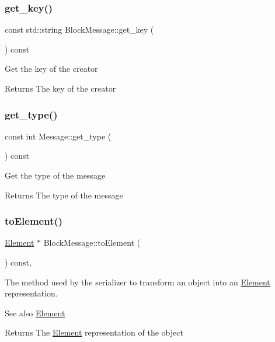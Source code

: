 \subsubsection{\texorpdfstring{get\+\_\+key()}{get\_key()}}
{\footnotesize\ttfamily const std\+::string Block\+Message\+::get\+\_\+key (\begin{DoxyParamCaption}{ }\end{DoxyParamCaption}) const}

Get the key of the creator

\begin{DoxyReturn}{Returns}
The key of the creator 
\end{DoxyReturn}
\mbox{\label{classMessage_a2a576dcffd45c4574fcdf2897ec26086}} 
\subsubsection{\texorpdfstring{get\+\_\+type()}{get\_type()}}
{\footnotesize\ttfamily const int Message\+::get\+\_\+type (\begin{DoxyParamCaption}{ }\end{DoxyParamCaption}) const\hspace{0.3cm}{\ttfamily [inherited]}}

Get the type of the message

\begin{DoxyReturn}{Returns}
The type of the message 
\end{DoxyReturn}
\mbox{\label{classBlockMessage_ab47afd5cfb7d6d5c544d8def5d0f9737}} 
\subsubsection{\texorpdfstring{to\+Element()}{toElement()}}
{\footnotesize\ttfamily \mbox{\hyperlink{classElement}{Element}} $\ast$ Block\+Message\+::to\+Element (\begin{DoxyParamCaption}{ }\end{DoxyParamCaption}) const\hspace{0.3cm}{\ttfamily [override]}, {\ttfamily [virtual]}}

The method used by the serializer to transform an object into an \mbox{\hyperlink{classElement}{Element}} representation. \begin{DoxySeeAlso}{See also}
\mbox{\hyperlink{classElement}{Element}}
\end{DoxySeeAlso}
\begin{DoxyReturn}{Returns}
The \mbox{\hyperlink{classElement}{Element}} representation of the object 
\end{DoxyReturn}


